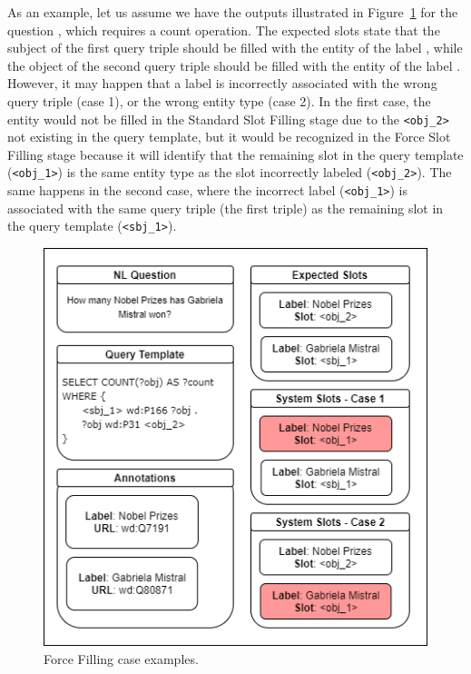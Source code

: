 As an example, let us assume we have the outputs illustrated in Figure~\ref{fig:forceFillingExample} 
for the question , which requires a 
count operation. The expected slots state that the subject of the first query triple should 
be filled with the entity of the label , while the object of the 
second query triple should be filled with the entity of the label . 
However, it may happen that a label is incorrectly associated with the wrong query triple 
(case 1), or the wrong entity type (case 2). In the first case, the  
entity would not be filled in the Standard Slot Filling stage due to the \texttt{<obj\_2>} 
not existing in the query template, but it would be recognized in the Force Slot Filling 
stage because it will identify that the remaining slot in the query template (\texttt{<obj\_1>}) 
is the same entity type as the slot incorrectly labeled (\texttt{<obj\_2>}). The same happens 
in the second case, where the incorrect label (\texttt{<obj\_1>}) is associated with the same 
query triple (the first triple) as the remaining slot in the query template (\texttt{<sbj\_1>}).

\begin{figure}[!h]
    \centering
    \includegraphics[scale=.5]{imagenes/3_system_overview/SlotFillingSpecialCases.png}
    \caption{Force Filling case examples.}
    \label{fig:forceFillingExample}
\end{figure}

